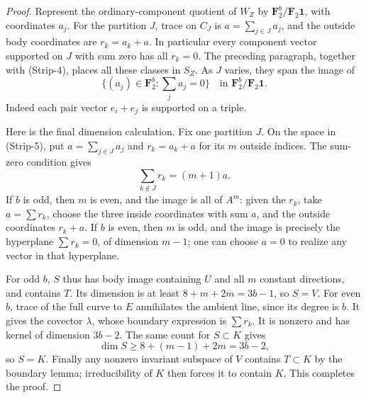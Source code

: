 \begin{proof}
Represent the ordinary-component quotient of $W_Z$ by
$\mathbf F_2^b/\mathbf F_2\mathbf1$, with coordinates $a_j$.
For the partition $J$, trace on $C_J$ is
$a=\sum_{j\in J}a_j$, and the outside body coordinates are
$r_k=a_k+a$. In particular every component vector supported
on $J$ with sum zero has all $r_k=0$. The preceding paragraph,
together with (Strip-4), places all these classes in $S_Z$.
As $J$ varies, they span the image of
\[
              \{(a_j)\in\mathbf F_2^b:\sum_j a_j=0\}
                  \quad\text{in }\mathbf F_2^b/\mathbf F_2\mathbf1.
                                                               \tag{Strip-5}
\]
Indeed each pair vector $e_i+e_j$ is supported on a triple.

Here is the final dimension calculation. Fix one partition $J$.
On the space in (Strip-5), put $a=\sum_{j\in J}a_j$ and
$r_k=a_k+a$ for its $m$ outside indices. The sum-zero condition
gives
\[
                         \sum_{k\notin J}r_k=(m+1)a.       \tag{Strip-6}
\]
If $b$ is odd, then $m$ is even, and the image is all of $A^m$:
given the $r_k$, take $a=\sum r_k$, choose the three inside
coordinates with sum $a$, and the outside coordinates $r_k+a$.
If $b$ is even, then $m$ is odd, and the image is precisely
the hyperplane $\sum r_k=0$, of dimension $m-1$; one can choose
$a=0$ to realize any vector in that hyperplane.

For odd $b$, $S$ thus has body image containing $U$ and all
$m$ constant directions, and contains $T$. Its dimension is
at least $8+m+2m=3b-1$, so $S=V$.
For even $b$, trace of the full curve to $E$ annihilates the
ambient line, since its degree is $b$. It gives the covector
$\lambda$, whose boundary expression is $\sum r_k$.
It is nonzero and has kernel of dimension $3b-2$. The same
count for $S\subset K$ gives
\[
                    \dim S\ge 8+(m-1)+2m=3b-2,
\]
so $S=K$. Finally any nonzero invariant subspace of $V$ contains
$T\subset K$ by the boundary lemma; irreducibility of $K$
then forces it to contain $K$. This completes the proof.
\end{proof}

